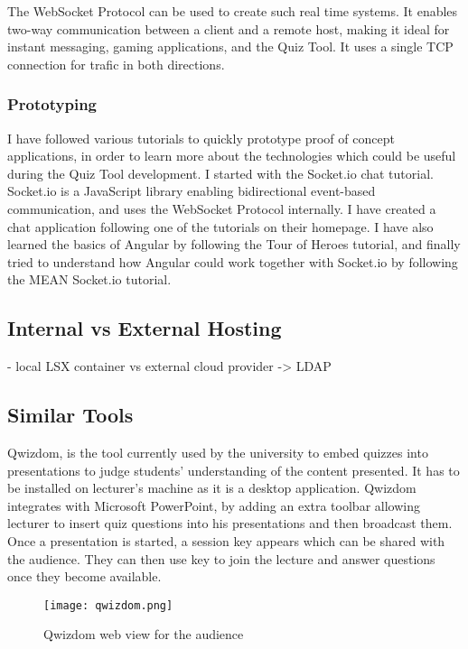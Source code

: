 The WebSocket Protocol can be used to create such real time systems. It enables two-way
communication between a client and a remote host, making it ideal for instant messaging,
gaming applications, and the Quiz Tool. It uses a single TCP connection for trafic
in both directions\cite{11}.

\subsubsection{Prototyping}
I have followed various tutorials to quickly prototype proof of concept applications,
in order to learn more about the technologies which could be useful during the Quiz Tool
development. I started with the Socket.io chat tutorial. Socket.io is
a JavaScript library enabling bidirectional event-based communication, and uses
the WebSocket Protocol internally\cite{12}. I have created a chat application following one
of the tutorials on their homepage\cite{13}. I have also learned the basics of
Angular by following the Tour of Heroes tutorial\cite{14}, and finally tried to
understand how Angular could work together with Socket.io by following the MEAN
Socket.io tutorial\cite{15}.

\subsection{Internal vs External Hosting}
- local LSX container vs external cloud provider -> LDAP

\subsection{Similar Tools}
Qwizdom\cite{1}, is the tool currently used by the university to embed quizzes into
presentations to judge students' understanding of the content presented. It has to be
installed on lecturer's machine as it is a desktop application. Qwizdom integrates
with Microsoft PowerPoint\cite{16}, by adding an extra toolbar allowing lecturer
to insert quiz questions into his presentations and then broadcast them. Once
a presentation is started, a session key appears which can be shared with the audience.
They can then use key to join the lecture and answer questions once they become available.

\begin{figure}[ht]
    \centering
    \texttt{[image: qwizdom.png]}
    \caption{Qwizdom web view for the audience}
    \label{fig:qwizdom}
\end{figure}

